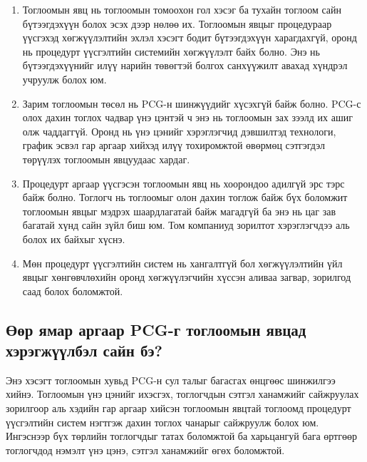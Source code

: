 \begin{enumerate}
	\item Тоглоомын явц нь тоглоомын томоохон гол хэсэг ба тухайн тоглоом сайн бүтээгдэхүүн болох эсэх дээр нөлөө их. Тоглоомын явцыг процедураар үүсгэхэд хөгжүүлэлтийн эхлэл хэсэгт бодит бүтээгдэхүүн харагдахгүй, оронд нь процедурт үүсгэлтийн системийн хөгжүүлэлт байх болно. Энэ нь бүтээгдэхүүнийг илүү нарийн төвөгтэй болгох санхүүжилт авахад хүндрэл учруулж болох юм.
	\item Зарим тоглоомын төсөл нь PCG-н шинжүүдийг хүсэхгүй байж болно. PCG-с олох дахин тоглох чадвар үнэ цэнтэй ч энэ нь тоглоомын зах зээлд их ашиг олж чаддаггүй. Оронд нь үнэ цэнийг хэрэглэгчид дэвшилтэд технологи, график эсвэл гар аргаар хийхэд илүү тохиромжтой өвөрмөц сэтгэгдэл төрүүлэх тоглоомын явцуудаас хардаг.
	\item	Процедурт аргаар үүсгэсэн тоглоомын явц нь хоорондоо адилгүй эрс тэрс байж болно. Тоглогч нь тоглоомыг олон дахин тоглож байж бүх боломжит тоглоомын явцыг мэдрэх шаардлагатай байж магадгүй ба энэ нь цаг зав багатай хүнд сайн зүйл биш юм. Том компаниуд зорилтот хэрэглэгчдээ аль болох их байхыг хүснэ.
	\item Мөн процедурт үүсгэлтийн систем нь хангалтгүй бол хөгжүүлэлтийн үйл явцыг хөнгөвчлөхийн оронд хөгжүүлэгчийн хүссэн аливаа загвар, зорилгод саад болох боломжтой.
\end{enumerate}

\subsection{Өөр ямар аргаар PCG-г тоглоомын явцад хэрэгжүүлбэл сайн бэ?}
Энэ хэсэгт тоглоомын хувьд PCG-н сул талыг багасгах өнцгөөс шинжилгээ хийнэ. Тоглоомын үнэ цэнийг ихэсгэх, тоглогчдын сэтгэл ханамжийг сайжруулах зорилгоор аль хэдийн гар аргаар хийсэн тоглоомын явцтай тоглоомд процедурт үүсгэлтийн систем нэгтгэж дахин тоглох чанарыг сайжруулж болох юм. Ингэснээр бүх төрлийн тоглогчдыг татах боломжтой ба харьцангуй бага өртгөөр тоглогчдод нэмэлт үнэ цэнэ, сэтгэл ханамжийг өгөх боломжтой.
